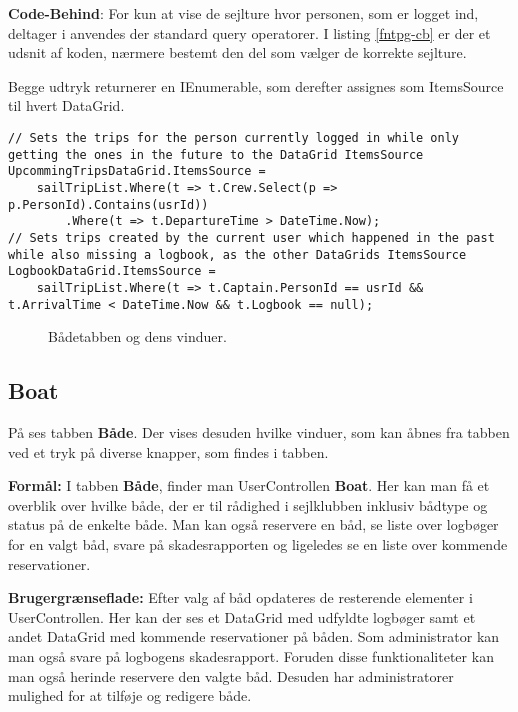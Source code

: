 \textbf{Code-Behind}: 
For kun at vise de sejlture hvor personen, som er logget ind, deltager i anvendes der standard query operatorer. 
I listing \ref{fntpg-cb} er der et udsnit af koden, nærmere bestemt den del som vælger de korrekte sejlture.

Begge udtryk returnerer en IEnumerable, som derefter assignes som ItemsSource til hvert DataGrid.

\begin{lstlisting}[frame=single, caption=Forsidens Code-Behind, label=fntpg-cb]
// Sets the trips for the person currently logged in while only getting the ones in the future to the DataGrid ItemsSource
UpcommingTripsDataGrid.ItemsSource =
    sailTripList.Where(t => t.Crew.Select(p => p.PersonId).Contains(usrId))
        .Where(t => t.DepartureTime > DateTime.Now);
// Sets trips created by the current user which happened in the past while also missing a logbook, as the other DataGrids ItemsSource 
LogbookDataGrid.ItemsSource =
    sailTripList.Where(t => t.Captain.PersonId == usrId && t.ArrivalTime < DateTime.Now && t.Logbook == null);
\end{lstlisting}

\begin{center}
    \begin{figure}[H]
        \caption{Bådetabben og dens vinduer.}
        \label{img:baade}  
        \vspace{-40pt}
    \end{figure}
\end{center}

\subsection{Boat}
På  ses tabben \textbf{Både}. 
Der vises desuden hvilke vinduer, som kan åbnes fra tabben ved et tryk på diverse knapper, som findes i tabben.

\textbf{Formål:}
I tabben \textbf{Både}, finder man UserControllen \textbf{Boat}.
Her kan man få et overblik over hvilke både, der er til rådighed i sejlklubben inklusiv bådtype og status på de enkelte både.
Man kan også reservere en båd, se liste over logbøger for en valgt båd, svare på skadesrapporten og ligeledes se en liste over kommende reservationer. 

\textbf{Brugergrænseflade:}
Efter valg af båd opdateres de resterende elementer i UserControllen. 
Her kan der ses et DataGrid med udfyldte logbøger samt et andet DataGrid med kommende reservationer på båden.
Som administrator kan man også svare på logbogens skadesrapport.
Foruden disse funktionaliteter kan man også herinde reservere den valgte båd.
Desuden har administratorer mulighed for at tilføje og redigere både.

